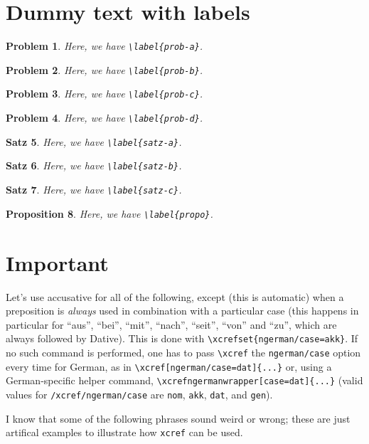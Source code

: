 \documentclass[ngerman]{article}
\newtheorem{problem}{Problem}
\newtheorem{satz}[problem]{Satz}
\newtheorem{proposition}[problem]{Proposition}
\begin{document}
\section*{Dummy text with labels}

\begin{problem}\label{prob-a}
Here, we have \verb|\label{prob-a}|.
\end{problem}
\begin{problem}\label{prob-b}
Here, we have \verb|\label{prob-b}|.
\end{problem}
\begin{problem}\label{prob-c}
Here, we have \verb|\label{prob-c}|.
\end{problem}
\begin{problem}\label{prob-d}
Here, we have \verb|\label{prob-d}|.
\end{problem}
\begin{satz}\label{satz-a}
Here, we have \verb|\label{satz-a}|.
\end{satz}
\begin{satz}\label{satz-b}
Here, we have \verb|\label{satz-b}|.
\end{satz}
\begin{satz}\label{satz-c}
Here, we have \verb|\label{satz-c}|.
\end{satz}
\begin{proposition}\label{propo}
Here, we have \verb|\label{propo}|.
\end{proposition}

\section*{Important}

Let's use accusative for all of the following, except (this is automatic) when
a preposition is \emph{always} used in combination with a particular case
(this happens in particular for “aus”, “bei”, “mit”, “nach”, “seit”, “von” and
“zu”, which are always followed by Dative). This is done with
\verb|\xcrefset{ngerman/case=akk}|. If no such command is performed, one has
to pass \verb|\xcref| the \verb|ngerman/case| option every time for German, as
in \verb|\xcref[ngerman/case=dat]{...}| or, using a German-specific helper
command, \verb|\xcrefngermanwrapper[case=dat]{...}| (valid values for
\texttt{/xcref/ngerman/case} are \verb|nom|, \verb|akk|, \verb|dat|, and
\verb|gen|).

I know that some of the following phrases sound weird or wrong; these are just
artifical examples to illustrate how \verb|xcref| can be used.
\end{document}
